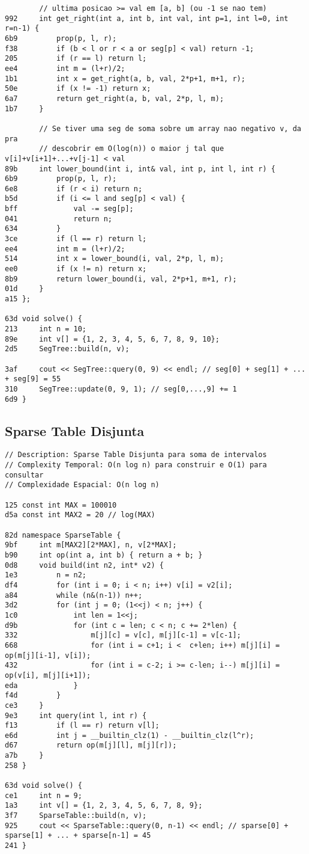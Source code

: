 \documentclass[11pt, a4paper, twoside]{article}
\begin{document}
\begin{lstlisting}
    	// ultima posicao >= val em [a, b] (ou -1 se nao tem)
992 	int get_right(int a, int b, int val, int p=1, int l=0, int r=n-1) {
6b9 		prop(p, l, r);
f38 		if (b < l or r < a or seg[p] < val) return -1;
205 		if (r == l) return l;
ee4 		int m = (l+r)/2;
1b1 		int x = get_right(a, b, val, 2*p+1, m+1, r);
50e 		if (x != -1) return x;
6a7 		return get_right(a, b, val, 2*p, l, m);
1b7 	}
    
    	// Se tiver uma seg de soma sobre um array nao negativo v, da pra
    	// descobrir em O(log(n)) o maior j tal que v[i]+v[i+1]+...+v[j-1] < val
89b 	int lower_bound(int i, int& val, int p, int l, int r) {
6b9 		prop(p, l, r);
6e8 		if (r < i) return n;
b5d 		if (i <= l and seg[p] < val) {
bff 			val -= seg[p];
041 			return n;
634 		}
3ce 		if (l == r) return l;
ee4 		int m = (l+r)/2;
514 		int x = lower_bound(i, val, 2*p, l, m);
ee0 		if (x != n) return x;
8b9 		return lower_bound(i, val, 2*p+1, m+1, r);
01d 	}
a15 };

63d void solve() {
213 	int n = 10;
89e 	int v[] = {1, 2, 3, 4, 5, 6, 7, 8, 9, 10};
2d5 	SegTree::build(n, v);
    
3af 	cout << SegTree::query(0, 9) << endl; // seg[0] + seg[1] + ... + seg[9] = 55
310 	SegTree::update(0, 9, 1); // seg[0,...,9] += 1
6d9 }
\end{lstlisting}

\subsection{Sparse Table Disjunta}
\begin{lstlisting}
// Description: Sparse Table Disjunta para soma de intervalos
// Complexity Temporal: O(n log n) para construir e O(1) para consultar
// Complexidade Espacial: O(n log n)

125 const int MAX = 100010
d5a const int MAX2 = 20 // log(MAX)

82d namespace SparseTable {
9bf 	int m[MAX2][2*MAX], n, v[2*MAX];
b90 	int op(int a, int b) { return a + b; }
0d8 	void build(int n2, int* v2) {
1e3 		n = n2;
df4 		for (int i = 0; i < n; i++) v[i] = v2[i];
a84 		while (n&(n-1)) n++;
3d2 		for (int j = 0; (1<<j) < n; j++) {
1c0 			int len = 1<<j;
d9b 			for (int c = len; c < n; c += 2*len) {
332 				m[j][c] = v[c], m[j][c-1] = v[c-1];
668 				for (int i = c+1; i <  c+len; i++) m[j][i] = op(m[j][i-1], v[i]);
432 				for (int i = c-2; i >= c-len; i--) m[j][i] = op(v[i], m[j][i+1]);
eda 			}
f4d 		}
ce3 	}
9e3 	int query(int l, int r) {
f13 		if (l == r) return v[l];
e6d 		int j = __builtin_clz(1) - __builtin_clz(l^r);
d67 		return op(m[j][l], m[j][r]);
a7b 	}
258 }

63d void solve() {
ce1 	int n = 9;
1a3 	int v[] = {1, 2, 3, 4, 5, 6, 7, 8, 9};
3f7 	SparseTable::build(n, v);
925 	cout << SparseTable::query(0, n-1) << endl; // sparse[0] + sparse[1] + ... + sparse[n-1] = 45
241 }
\end{lstlisting}
\end{document}

